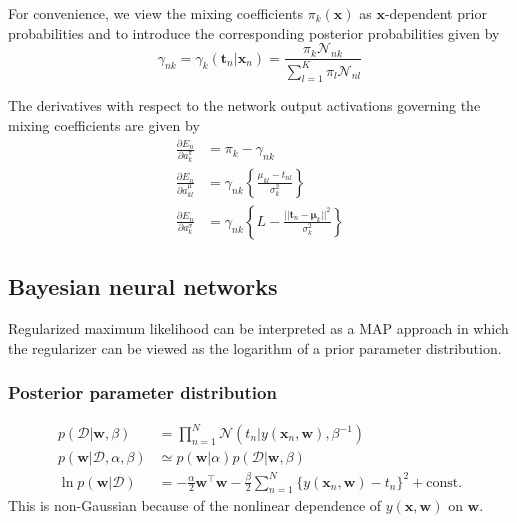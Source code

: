 \documentclass[a4paper]{report}
\newcommand{\up}{\mathrm}
\renewcommand{\bf}{\mathbf}
\renewcommand{\cal}{\mathcal}
\newcommand{\bs}{\boldsymbol}
\begin{document}
For convenience, we view the mixing coefficients $\pi_k(\bf{x})$ as $\bf{x}$-dependent prior probabilities and to introduce the corresponding posterior probabilities given by
\begin{equation}
	\gamma_{nk} = \gamma_k(\bf{t}_n|\bf{x}_n) = \frac{\pi_k \cal{N}_{nk}}{\sum_{l=1}^K \pi_l \cal{N}_{nl}}
\end{equation}

The derivatives with respect to the network output activations governing the mixing coefficients are given by
\begin{align}
	\frac{\partial E_n}{\partial a_{k}^{\pi}} &= \pi_k - \gamma_{nk} \\
	\frac{\partial E_n}{\partial a_{kl}^{\mu}} &= \gamma_{nk} \left\{ \frac{\mu_{kl}-t_{nl}}{\sigma_k^2} \right\} \\
	\frac{\partial E_n}{\partial a_{k}^{\sigma}} &= \gamma_{nk} \left\{ L - \frac{||\bf{t}_n-\bs{\mu}_k||^2}{\sigma_k^2} \right\}
\end{align}

\subsection{Bayesian neural networks}
Regularized maximum likelihood can be interpreted as a MAP approach in which the regularizer can be viewed as the logarithm of a prior parameter distribution.

\subsubsection{Posterior parameter distribution}
\begin{align}
	p(\cal{D}|\bf{w},\beta) &= \prod_{n=1}^N \cal{N}(t_n|y(\bf{x}_n,\bf{w}),\beta^{-1}) \\
	p(\bf{w}|\cal{D},\alpha,\beta) &\simeq p(\bf{w}|\alpha) p(\cal{D}|\bf{w},\beta) \\
	\ln p(\bf{w}|\cal{D}) &= -\frac{\alpha}{2} \bf{w}^{\intercal} \bf{w} - \frac{\beta}{2} \sum_{n=1}^N \{ y(\bf{x}_n,\bf{w})-t_n \}^2 + \up{const}.
\end{align}
This is non-Gaussian because of the nonlinear dependence of $y(\bf{x},\bf{w})$ on $\bf{w}$.
\end{document}
